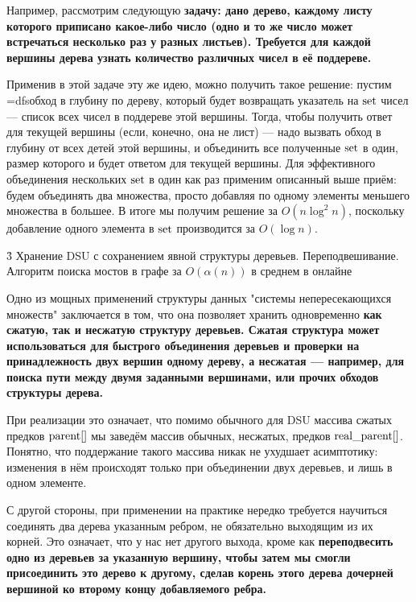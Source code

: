 Например, рассмотрим следующую \bf{задачу}: дано дерево, каждому листу которого приписано какое-либо число (одно и то же число может встречаться несколько раз у разных листьев). Требуется для каждой вершины дерева узнать количество различных чисел в её поддереве.

Применив в этой задаче эту же идею, можно получить такое решение: пустим \algohref=dfs{обход в глубину} по дереву, который будет возвращать указатель на ${\rm set}$ чисел --- список всех чисел в поддереве этой вершины. Тогда, чтобы получить ответ для текущей вершины (если, конечно, она не лист) --- надо вызвать обход в глубину от всех детей этой вершины, и объединить все полученные ${\rm set}$ в один, размер которого и будет ответом для текущей вершины. Для эффективного объединения нескольких ${\rm set}$ в один как раз применим описанный выше приём: будем объединять два множества, просто добавляя по одному элементы меньшего множества в большее. В итоге мы получим решение за $O (n \log^2 n)$, поскольку добавление одного элемента в ${\rm set}$ производится за $O (\log n)$.



\h3{ Хранение DSU с сохранением явной структуры деревьев. Переподвешивание. Алгоритм поиска мостов в графе за $O(\alpha(n))$ в среднем в онлайне }

Одно из мощных применений структуры данных "системы непересекающихся множеств" заключается в том, что она позволяет хранить одновременно \bf{как сжатую, так и несжатую структуру деревьев}. Сжатая структура может использоваться для быстрого объединения деревьев и проверки на принадлежность двух вершин одному дереву, а несжатая --- например, для поиска пути между двумя заданными вершинами, или прочих обходов структуры дерева.

При реализации это означает, что помимо обычного для DSU массива сжатых предков ${\rm parent}[]$ мы заведём массив обычных, несжатых, предков ${\rm real\_parent}[]$. Понятно, что поддержание такого массива никак не ухудшает асимптотику: изменения в нём происходят только при объединении двух деревьев, и лишь в одном элементе.

С другой стороны, при применении на практике нередко требуется научиться соединять два дерева указанным ребром, не обязательно выходящим из их корней. Это означает, что у нас нет другого выхода, кроме как \bf{переподвесить} одно из деревьев за указанную вершину, чтобы затем мы смогли присоединить это дерево к другому, сделав корень этого дерева дочерней вершиной ко второму концу добавляемого ребра.

